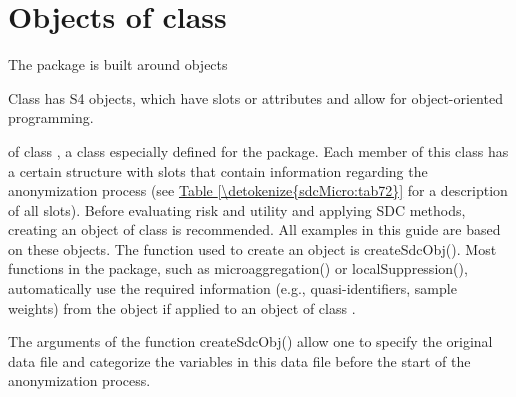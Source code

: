\documentclass[letterpaper,10pt,english]{sphinxmanual}
\begin{document}
\section{Objects of class }
\label{\detokenize{sdcMicro:objects-of-class-sdcmicroobj}}
The  package is built around objects %
\begin{footnote}[7]\sphinxAtStartFootnote
Class  has S4 objects, which have slots or attributes
and allow for object-oriented programming.
%
\end{footnote} of
class , a class especially defined for the 
package. Each member of this class has a certain structure with slots
that contain information regarding the anonymization process (see \hyperref[\detokenize{sdcMicro:tab72}]{Table \ref{\detokenize{sdcMicro:tab72}}}
for a description of all slots). Before evaluating risk
and utility and applying SDC methods, creating an object of class
 is recommended. All examples in this guide are based on these
objects. The function used to create an  object is
createSdcObj(). Most functions in the  package, such as
microaggregation() or localSuppression(), automatically use the required
information (e.g., quasi-identifiers, sample weights) from the
 object if applied to an object of class .

The arguments of the function createSdcObj() allow one to specify the
original data file and categorize the variables in this data file before
the start of the anonymization process. 
\end{document}
